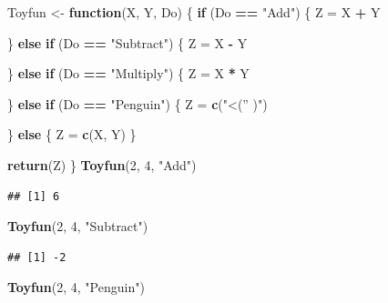 \documentclass[
]{book}
\newenvironment{Shaded}{\begin{snugshade}}{\end{snugshade}}
\newcommand{\ControlFlowTok}[1]{\textcolor[rgb]{0.13,0.29,0.53}{\textbf{#1}}}
\newcommand{\DecValTok}[1]{\textcolor[rgb]{0.00,0.00,0.81}{#1}}
\newcommand{\KeywordTok}[1]{\textcolor[rgb]{0.13,0.29,0.53}{\textbf{#1}}}
\newcommand{\NormalTok}[1]{#1}
\newcommand{\OperatorTok}[1]{\textcolor[rgb]{0.81,0.36,0.00}{\textbf{#1}}}
\newcommand{\StringTok}[1]{\textcolor[rgb]{0.31,0.60,0.02}{#1}}
\begin{document}
\begin{Shaded}
\begin{Highlighting}[]
\NormalTok{Toyfun <-}\StringTok{ }\ControlFlowTok{function}\NormalTok{(X, Y, Do) \{}
    \ControlFlowTok{if}\NormalTok{ (Do }\OperatorTok{==}\StringTok{ "Add"}\NormalTok{) \{}
\NormalTok{        Z =}\StringTok{ }\NormalTok{X }\OperatorTok{+}\StringTok{ }\NormalTok{Y}

\NormalTok{    \} }\ControlFlowTok{else} \ControlFlowTok{if}\NormalTok{ (Do }\OperatorTok{==}\StringTok{ "Subtract"}\NormalTok{) \{}
\NormalTok{        Z =}\StringTok{ }\NormalTok{X }\OperatorTok{-}\StringTok{ }\NormalTok{Y}

\NormalTok{    \} }\ControlFlowTok{else} \ControlFlowTok{if}\NormalTok{ (Do }\OperatorTok{==}\StringTok{ "Multiply"}\NormalTok{) \{}
\NormalTok{        Z =}\StringTok{ }\NormalTok{X }\OperatorTok{*}\StringTok{ }\NormalTok{Y}

\NormalTok{    \} }\ControlFlowTok{else} \ControlFlowTok{if}\NormalTok{ (Do }\OperatorTok{==}\StringTok{ "Penguin"}\NormalTok{) \{}
\NormalTok{        Z =}\StringTok{ }\KeywordTok{c}\NormalTok{(}\StringTok{"<('' )"}\NormalTok{)}

\NormalTok{    \} }\ControlFlowTok{else}\NormalTok{ \{}
\NormalTok{        Z =}\StringTok{ }\KeywordTok{c}\NormalTok{(X, Y)}
\NormalTok{    \}}

    \KeywordTok{return}\NormalTok{(Z)}
\NormalTok{\}}
\KeywordTok{Toyfun}\NormalTok{(}\DecValTok{2}\NormalTok{, }\DecValTok{4}\NormalTok{, }\StringTok{"Add"}\NormalTok{)}
\end{Highlighting}
\end{Shaded}

\begin{verbatim}
## [1] 6
\end{verbatim}

\begin{Shaded}
\begin{Highlighting}[]
\KeywordTok{Toyfun}\NormalTok{(}\DecValTok{2}\NormalTok{, }\DecValTok{4}\NormalTok{, }\StringTok{"Subtract"}\NormalTok{)}
\end{Highlighting}
\end{Shaded}

\begin{verbatim}
## [1] -2
\end{verbatim}

\begin{Shaded}
\begin{Highlighting}[]
\KeywordTok{Toyfun}\NormalTok{(}\DecValTok{2}\NormalTok{, }\DecValTok{4}\NormalTok{, }\StringTok{"Penguin"}\NormalTok{)}
\end{Highlighting}
\end{Shaded}
\end{document}
